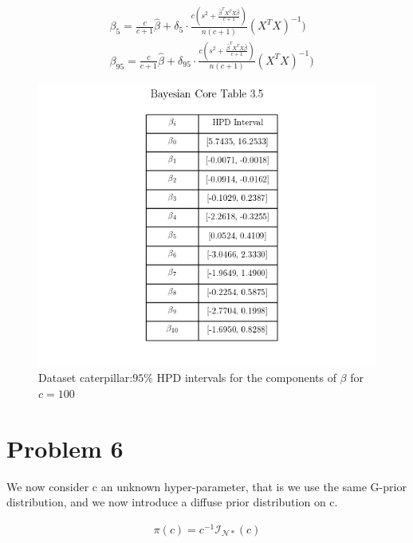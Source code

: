 \documentclass{article}
\begin{document}
\begin{equation}
\begin{aligned}
    & \beta_{5} = \frac{c}{c+1}\hat{\beta} + \delta_{5} \cdot \frac{c(s^2+\frac{\hat{\beta}^{T} X^{T} X \hat{\beta}}{c+1})}{n(c+1)}(X^T X)^{-1}) \\
    & \beta_{95} = \frac{c}{c+1}\hat{\beta} + \delta_{95} \cdot \frac{c(s^2+\frac{\hat{\beta}^{T} X^{T} X \hat{\beta}}{c+1})}{n(c+1)}(X^T X)^{-1}) 
\end{aligned}
\end{equation}

\begin{figure}[h!]
\centering
\includegraphics[scale=0.6]{Table3_5.png}
\caption{Dataset caterpillar:$95\%$ HPD intervals for the components of $\beta$ for $c=100$}
\end{figure}

\newpage
\section{Problem 6}
We now consider c an unknown hyper-parameter, that is we use the same G-prior distribution, and we now introduce a diffuse prior distribution on c.

\begin{equation}
\begin{aligned}
    \pi(c)=c^{-1} \mathcal{I}_{\mathcal{N*}}(c)
\end{aligned}
\end{equation}
\end{document}
